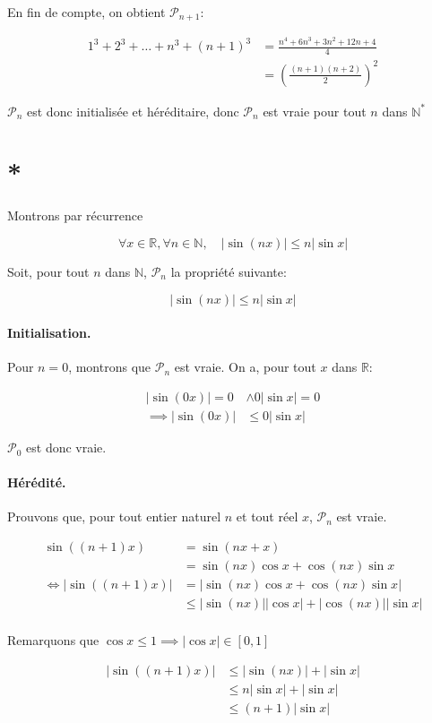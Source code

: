 \documentclass{article}
\newcommand{\R}{\mathds{R}}
\newcommand{\N}{\mathds{N}}
\newcommand{\qed}{\square}
\newcommand{\spliteq}[1]{\begin{equation*}\begin{split}#1\end{split}\end{equation*}}
\renewcommand{\leq}{\leqslant}
\begin{document}
\newpage
En fin de compte, on obtient $\mathcal{P}_{n+1}$:

\spliteq{
	1^3 + 2^3 + \dots + n^3 + (n+1)^3 &= \frac{n^4+6n^3+3n^2+12n+4}{4} \\
					  &= \left( \frac{(n+1)(n+2)}{2} \right)^2
}

$\mathcal{P}_n$ est donc initialisée et héréditaire, 
donc $\mathcal{P}_n$ est vraie pour tout $n$ dans $\N^\ast$ \qed


\section{*}

Montrons par récurrence

\[
	\forall x \in \R, \forall n \in \N, \quad |\sin{(nx)}| \leq n|\sin{x}|
\]

Soit, pour tout $n$ dans $\N$, $\mathcal{P}_n$ la propriété suivante:

\[
	|\sin(nx)| \leq n|\sin x|
\]

\paragraph{Initialisation.} Pour $n = 0$, montrons que $\mathcal{P}_n$ est vraie.
On a, pour tout $x$ dans $\R$:

\spliteq{
	|\sin(0x)| = 0 &\land 0|\sin x| = 0 \\
	\implies |\sin(0x)| &\leq 0|\sin x|
}

$\mathcal{P}_0$ est donc vraie.

\paragraph{Hérédité.} Prouvons que, pour tout entier naturel $n$ et tout réel $x$, $\mathcal{P}_n$ est vraie. 


\spliteq{
	\sin((n+1)x) &= \sin(nx+x) \\
		     &= \sin(nx)\cos x + \cos(nx) \sin x \\
	\iff |\sin((n+1)x) | &= | \sin(nx)\cos x + \cos(nx) \sin x | \\
			     &\leq | \sin(nx)||\cos x|+|\cos(nx)||\sin x | \\
}

Remarquons que $\cos x \leq 1 \implies |\cos x| \in [0, 1]$

\spliteq{
	|\sin((n+1)x)| &\leq |\sin(nx)| + |\sin x| \\
		       &\leq n|\sin x| + |\sin x| \\
		       &\leq (n+1)|\sin x|
}
\end{document}
